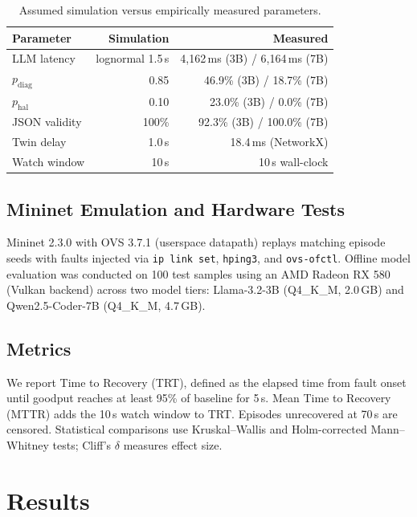 \documentclass[sn-mathphys,Numbered]{sn-jnl}
\begin{document}
\begin{table}[t]\centering\footnotesize\setlength{\tabcolsep}{4pt}
\caption{Assumed simulation versus empirically measured parameters.}\label{tab:assump}%
\begin{tabular*}{\columnwidth}{@{\extracolsep\fill}lrr@{}}
\toprule
Parameter & Simulation & Measured \\
\midrule
LLM latency & lognormal 1.5\,s & 4,162\,ms (3B) / 6,164\,ms (7B) \\
$p_\text{diag}$ & 0.85 & 46.9\% (3B) / 18.7\% (7B) \\
$p_\text{hal}$ & 0.10 & 23.0\% (3B) / 0.0\% (7B) \\
JSON validity & 100\% & 92.3\% (3B) / 100.0\% (7B) \\
Twin delay & 1.0\,s & 18.4\,ms (NetworkX) \\
Watch window & 10\,s & 10\,s wall-clock \\
\bottomrule
\end{tabular*}
\end{table}

\subsection{Mininet Emulation and Hardware Tests}
Mininet 2.3.0 with OVS 3.7.1 (userspace datapath) replays matching episode seeds with faults injected via \texttt{ip link set}, \texttt{hping3}, and \texttt{ovs-ofctl}. Offline model evaluation was conducted on 100 test samples using an AMD Radeon RX 580 (Vulkan backend) across two model tiers: Llama-3.2-3B (Q4\_K\_M, 2.0\,GB) and Qwen2.5-Coder-7B (Q4\_K\_M, 4.7\,GB).

\subsection{Metrics}
We report Time to Recovery (TRT), defined as the elapsed time from fault onset until goodput reaches at least 95\% of baseline for 5\,s. Mean Time to Recovery (MTTR) adds the 10\,s watch window to TRT. Episodes unrecovered at 70\,s are censored. Statistical comparisons use Kruskal--Wallis and Holm-corrected Mann--Whitney tests; Cliff's $\delta$ measures effect size.

\FloatBarrier
\section{Results}\label{sec:results}
\end{document}
